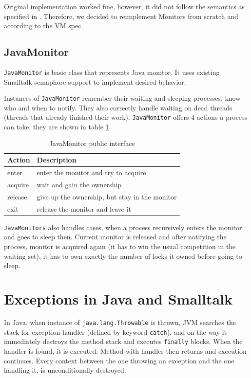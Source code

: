 \documentclass[11pt,twoside,a4paper]{book}
\begin{document}
Original implementation worked fine, however, it did not follow the semantics as specified in \cite[section~8.14]{vmspec}.
Therefore, we decided to reimplement Monitors from scratch and according to the VM spec. 

\subsection{JavaMonitor}

\texttt{JavaMonitor} is basic class that represents Java monitor.
It uses existing Smalltalk semaphore support to implement desired behavior.

Instances of \texttt{JavaMonitor} remember their waiting and sleeping processes, know who and when to notify.
They also correctly handle waiting on dead threads (threads that already finished their work).
\texttt{JavaMonitor} offers 4 actions a process can take, they are shown in table \ref{tab:java-monitor-iface}.

\begin{table}
	\centering
	\begin{tabular}{|l|p{9cm}|}
		\hline
		Action & Description \\
		\hline
		\hline
		enter & enter the monitor and try to acquire \\
		\hline
		acquire & wait and gain the ownership \\
		\hline
		release & give up the ownership, but stay in the monitor \\
		\hline
		exit & release the monitor and leave it \\
		\hline
	\end{tabular}
	\caption{JavaMonitor public interface}
	\label{tab:java-monitor-iface}
\end{table}

\texttt{JavaMonitors} also handles cases, when a process recursively enters the monitor and goes to sleep then. 
Current monitor is released and after notifying the process, monitor is acquired again (it has to win the usual competition in the waiting set), it has to own exactly the number of locks it owned before going to sleep.

\section{Exceptions in Java and Smalltalk}

In Java, when instance of \texttt{java.lang.Throwable} is thrown, JVM searches the stack for exception handler (defined by keyword \texttt{catch}), and on the way it immediately destroys the method stack and executes \texttt{finally} blocks.
When the handler is found, it is executed.
Method with handler then returns and execution continues.
Every context between the one throwing an exception and the one handling it, is unconditionally destroyed.
\end{document}
